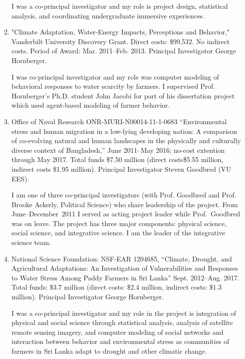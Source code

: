 \begin{enumerate}
\begin{credit}
I was a co-principal investigator and my role is project design, statistical analysis, and coordinating undergraduate immersive experiences.
\end{credit}
	\item "Climate Adaptation, Water-Energy Impacts, Perceptions and Behavior," Vanderbilt University Discovery Grant. Direct costs: \$99,532. No indirect costs. Period of Award: Mar. 2011--Feb. 2013. Principal Investigator George Hornberger.
\begin{credit}
I was co-principal investigator and my role was computer modeling of behavioral responses to water scarcity by farmers. I supervised Prof. Hornberger's Ph.D. student John Jacobi for part of his dissertation project which used agent-based modeling of farmer behavior.
\end{credit}
	\item Office of Naval Research ONR-MURI-N00014-11-1-0683 ``Environmental stress and human migration in a low-lying developing nation: A comparison of co-evolving natural and human landscapes in the physically and culturally diverse context of Bangladesh,'' June 2011--May 2016; no-cost extention through May 2017. Total funds \$7.50 million (direct costs\$5.55 million, indirect costs \$1.95 million). Principal Investigator Steven Goodbred (VU EES).
\begin{credit}
I am one of three co-principal investigators (with Prof. Goodbred and Prof. Brooke Ackerly, Political Science) who share leadership of the project. From June--December~2011 I served as acting project leader while Prof.~Goodbred was on leave. The project has three major components: physical science, social science, and integrative science. I am the leader of the integrative science team.
\end{credit}
	\item National Science Foundation: NSF-EAR 1204685, ``Climate, Drought, and Agricultural Adaptations: An Investigation of Vulnerabilities and Responses to Water Stress Among Paddy Farmers in Sri Lanka'' Sept. 2012--Aug. 2017. Total funds: \$3.7 million (direct costs: \$2.4 million, indirect costs: \$1.3 million). Principal Investigator George Hornberger.
\begin{credit}
I was a co-principal investigator and my role in the project is integration of physical and social science through statistical analysis, analysis of satellite remote sensing imagery, and computer modeling of social networks and interaction between behavior and environmental stress as communities of farmers in Sri Lanka adapt to drought and other climatic change.
\end{credit}
\end{enumerate}
\iffalse

